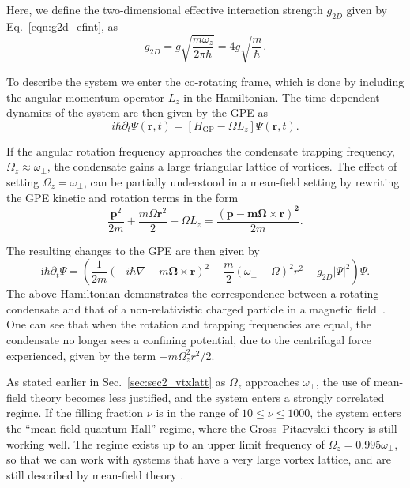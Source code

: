 Here, we define the two-dimensional effective interaction strength $g_{2D}$ given by Eq.~\eqref{eqn:g2d_efint}, as
\begin{equation}
g_{2D} = g\sqrt{\frac{m\omega_z}{2\pi\hbar}} = 4g \sqrt{\frac{m}{\hbar}}.
\end{equation}

To describe the system we enter the co-rotating frame, which is done by including the angular momentum operator $L_z$ in the Hamiltonian. The time dependent dynamics of the system are then given by the GPE as
\begin{equation}\label{eqn:gpe2d_}
	i\hbar\partial_t\Psi(\mathbf{r},t) = \left[ H_{\text{GP}}  -  \Omega L_z \right] \Psi(\mathbf{r},t).
\end{equation}

If the angular rotation frequency approaches the condensate trapping frequency, $\Omega_z \approx \omega_\perp$, the condensate gains a large triangular lattice of vortices.  The effect of setting $\Omega_z=\omega_\perp$, can be partially understood in a mean-field setting by rewriting the GPE kinetic and rotation terms in the form
\begin{equation}
    \frac{\mathbf{p}^2}{2m} + \frac{m\Omega\mathbf{r}^2}{2} - \Omega L_z = \frac{\mathbf{\left(p -m\boldsymbol{\Omega}\times\mathbf{r}\right)^2}}{2m}.
\end{equation}

The resulting changes to the GPE are then given by
\begin{equation}\label{eqn:vector_potential_gpe}
    \textrm{i}\hbar\partial_t \Psi =
    \left(\frac{1}{2m}(-i\hbar\nabla - m\boldsymbol{\Omega}\times\mathbf{r})^2 + \frac{m}{2}(\omega_\perp - \Omega)^2{r}^2 + g_{2D}|\Psi|^2 \right)\Psi.
\end{equation}
The above Hamiltonian demonstrates the correspondence between a rotating condensate and that of a non-relativistic charged particle in a magnetic field~\cite{Vtx:Mueller_prl_2002}.
One can see that when the rotation and trapping frequencies are equal, the condensate no longer sees a confining potential, due to the centrifugal force experienced, given by the term $-m\Omega_z^2r^2/2$.

As stated earlier in Sec.~\ref{sec:sec2_vtxlatt} as $\Omega_z$ approaches $\omega_\perp$, the use of mean-field theory becomes less justified, and the system enters a strongly correlated regime. If the filling fraction $\nu$ is in the range of $10 \leq \nu \leq 1000$, the system enters the ``mean-field quantum Hall'' regime, where the Gross--Pitaevskii theory is still working well. The regime exists up to an upper limit frequency of $\Omega_z = 0.995\omega_\perp$, so that we can work with systems that have a very large vortex lattice, and are still described by mean-field theory \cite{BEC:Fetter_revmodphys_2009}.

